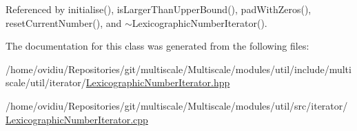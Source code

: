 \-Referenced by initialise(), is\-Larger\-Than\-Upper\-Bound(), pad\-With\-Zeros(), reset\-Current\-Number(), and $\sim$\-Lexicographic\-Number\-Iterator().



\-The documentation for this class was generated from the following files\-:\begin{DoxyCompactItemize}
\item 
/home/ovidiu/\-Repositories/git/multiscale/\-Multiscale/modules/util/include/multiscale/util/iterator/\hyperlink{LexicographicNumberIterator_8hpp}{\-Lexicographic\-Number\-Iterator.\-hpp}\item 
/home/ovidiu/\-Repositories/git/multiscale/\-Multiscale/modules/util/src/iterator/\hyperlink{LexicographicNumberIterator_8cpp}{\-Lexicographic\-Number\-Iterator.\-cpp}\end{DoxyCompactItemize}
